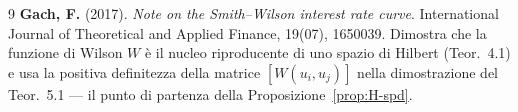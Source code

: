\documentclass[11pt,a4paper]{article}
\theoremstyle{plain}
\theoremstyle{definition}
\theoremstyle{remark}
\begin{document}
\begin{thebibliography}{9}
  \textbf{Gach, F.} (2017).
  \textit{Note on the Smith--Wilson interest rate curve}.
  International Journal of Theoretical and Applied Finance, 19(07), 1650039.
  Dimostra che la funzione di Wilson $W$ è il nucleo riproducente di uno spazio di Hilbert
  (Teor.~4.1) e usa la positiva definitezza della matrice $[W(u_i,u_j)]$ nella dimostrazione
  del Teor.~5.1 --- il punto di partenza della Proposizione~\ref{prop:H-spd}.

\end{thebibliography}
\end{document}
